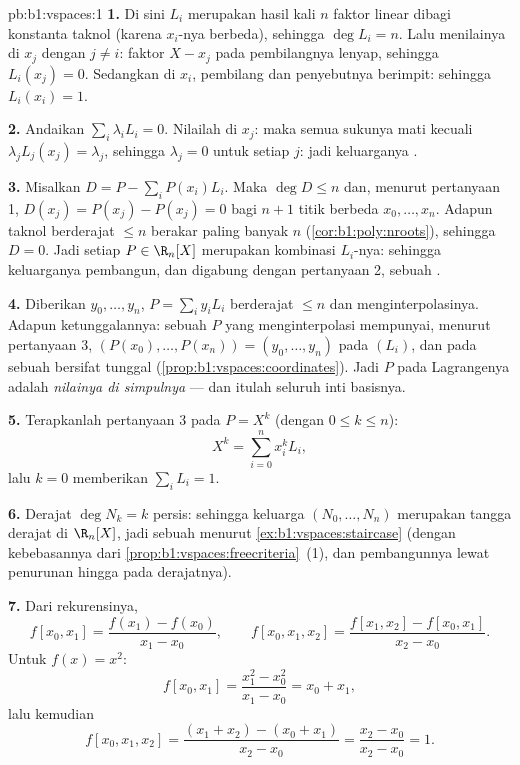 \begin{solution}{pb:b1:vspaces:1}
\textbf{1.} Di sini $L_i$ merupakan hasil kali $n$ faktor linear dibagi
konstanta taknol (karena $x_i$-nya berbeda), sehingga $\deg L_i = n$.
Lalu menilainya di $x_j$ dengan $j \neq i$: faktor $X - x_j$ pada
pembilangnya lenyap, sehingga $L_i(x_j) = 0$. Sedangkan di $x_i$, pembilang dan
penyebutnya berimpit: sehingga $L_i(x_i) = 1$.

\textbf{2.} Andaikan $\sum_i \lambda_i L_i = 0$. Nilailah di $x_j$:
maka semua sukunya mati kecuali $\lambda_j L_j(x_j) = \lambda_j$, sehingga
$\lambda_j = 0$ untuk setiap $j$: jadi keluarganya .

\textbf{3.} Misalkan $D = P - \sum_i P(x_i) L_i$. Maka $\deg D \leq n$
dan, menurut pertanyaan 1, $D(x_j) = P(x_j) - P(x_j) = 0$ bagi $n + 1$
titik berbeda $x_0, \dots, x_n$. Adapun  taknol berderajat
$\leq n$ berakar paling banyak $n$ (\cref{cor:b1:poly:nroots}), sehingga $D
= 0$. Jadi setiap $P \in \R_n[X]$ merupakan kombinasi $L_i$-nya:
sehingga keluarganya pembangun, dan digabung dengan pertanyaan 2, sebuah .

\textbf{4.} Diberikan $y_0, \dots, y_n$,  $P = \sum_i
y_i L_i$ berderajat $\leq n$ dan menginterpolasinya. Adapun ketunggalannya: sebuah
$P$ yang menginterpolasi mempunyai, menurut pertanyaan 3,  $(P(x_0), \dots,
P(x_n)) = (y_0, \dots, y_n)$ pada  $(L_i)$, dan 
pada sebuah  bersifat tunggal (\cref{prop:b1:vspaces:coordinates}). Jadi
 $P$ pada  Lagrangenya adalah \emph{nilainya di
simpulnya} --- dan itulah seluruh inti basisnya.

\textbf{5.} Terapkanlah pertanyaan 3 pada $P = X^k$ (dengan $0 \leq k \leq n$):
\[
X^k = \sum_{i=0}^{n} x_i^{k} L_i ,
\]
lalu $k = 0$ memberikan $\sum_i L_i = 1$.

\textbf{6.} Derajat $\deg N_k = k$ persis: sehingga keluarga $(N_0, \dots, N_n)$
merupakan tangga derajat di $\R_n[X]$, jadi sebuah  menurut
\cref{ex:b1:vspaces:staircase} (dengan kebebasannya dari
\cref{prop:b1:vspaces:freecriteria}~(1), dan pembangunnya lewat penurunan
hingga pada derajatnya).

\textbf{7.} Dari rekurensinya,
\[
f[x_0, x_1] = \frac{f(x_1) - f(x_0)}{x_1 - x_0},
\qquad
f[x_0, x_1, x_2] = \frac{f[x_1, x_2] - f[x_0, x_1]}{x_2 - x_0}.
\]
Untuk $f(x) = x^2$:
\[
f[x_0, x_1] = \frac{x_1^2 - x_0^2}{x_1 - x_0} = x_0 + x_1,
\]
lalu kemudian
\[
f[x_0, x_1, x_2]
= \frac{(x_1 + x_2) - (x_0 + x_1)}{x_2 - x_0}
= \frac{x_2 - x_0}{x_2 - x_0} = 1 .
\]


\end{solution}
